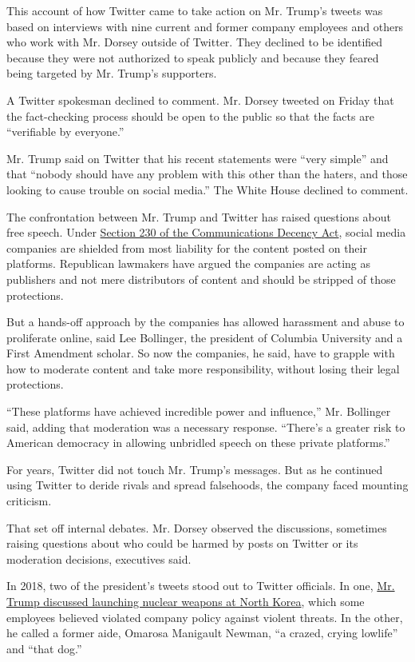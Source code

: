 This account of how Twitter came to take action on Mr. Trump's tweets
was based on interviews with nine current and former company employees
and others who work with Mr. Dorsey outside of Twitter. They declined to
be identified because they were not authorized to speak publicly and
because they feared being targeted by Mr. Trump's supporters.

A Twitter spokesman declined to comment. Mr. Dorsey tweeted on Friday
that the fact-checking process should be open to the public so that the
facts are ``verifiable by everyone.''

Mr. Trump said on Twitter that his recent statements were ``very
simple'' and that ``nobody should have any problem with this other than
the haters, and those looking to cause trouble on social media.'' The
White House declined to comment.

The confrontation between Mr. Trump and Twitter has raised questions
about free speech. Under
\href{https://www.nytimes3xbfgragh.onion/2020/05/28/business/section-230-internet-speech.html}{Section
230 of the Communications Decency Act}, social media companies are
shielded from most liability for the content posted on their platforms.
Republican lawmakers have argued the companies are acting as publishers
and not mere distributors of content and should be stripped of those
protections.

But a hands-off approach by the companies has allowed harassment and
abuse to proliferate online, said Lee Bollinger, the president of
Columbia University and a First Amendment scholar. So now the companies,
he said, have to grapple with how to moderate content and take more
responsibility, without losing their legal protections.

``These platforms have achieved incredible power and influence,'' Mr.
Bollinger said, adding that moderation was a necessary response.
``There's a greater risk to American democracy in allowing unbridled
speech on these private platforms.''

For years, Twitter did not touch Mr. Trump's messages. But as he
continued using Twitter to deride rivals and spread falsehoods, the
company faced mounting criticism.

That set off internal debates. Mr. Dorsey observed the discussions,
sometimes raising questions about who could be harmed by posts on
Twitter or its moderation decisions, executives said.

In 2018, two of the president's tweets stood out to Twitter officials.
In one,
\href{https://twitter.com/realdonaldtrump/status/948355557022420992?lang=en}{Mr.
Trump discussed launching nuclear weapons at North Korea}, which some
employees believed violated company policy against violent threats. In
the other, he called a former aide, Omarosa Manigault Newman, ``a
crazed, crying lowlife'' and ``that dog.''

